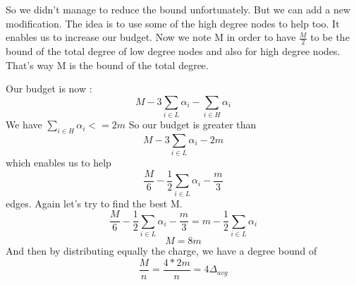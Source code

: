 \documentclass{article}
\begin{document}
So we didn't manage to reduce the bound unfortunately. But we can add a
new modification. The idea is to use some of the high degree nodes to help too. It enables
us to increase our budget. Now we note M in order to have $\frac{M}{2}$
to be the bound of the total degree of low degree nodes and also for high
degree nodes. That's way M is the bound of the total degree.

Our budget is now :
$$M - 3\sum_{i \in L}\alpha_i - \sum_{i \in H}\alpha_i$$
We have $\sum_{i \in H}\alpha_i <= 2m$
So our budget is greater than
$$M - 3\sum_{i \in L}\alpha_i -2m$$
which enables us to help
$$\frac{M}{6} - \frac{1}{2}\sum_{i \in L}\alpha_i - \frac{m}{3}$$
edges. Again let's try to find the best M.
$$\frac{M}{6} - \frac{1}{2}\sum_{i \in L}\alpha_i - \frac{m}{3} = m - \frac{1}{2}\sum_{i \in L}\alpha_i$$
$$M = 8m$$
And then by distributing equally the charge, we have a degree bound of
$$\frac{M}{n} = \frac{4*2m}{n} = 4\Delta_{avg}$$
\end{document}

